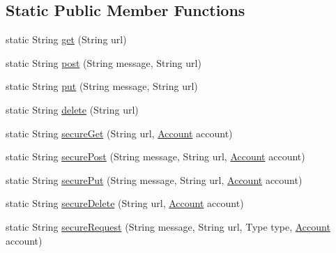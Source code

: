 \subsection*{Static Public Member Functions}
\begin{DoxyCompactItemize}
\item 
static String \hyperlink{classuk_1_1ac_1_1swan_1_1digitaltrails_1_1utils_1_1_h_t_t_p_ae693a8b73812be4b9923a973cb5fb50e}{get} (String url)
\item 
static String \hyperlink{classuk_1_1ac_1_1swan_1_1digitaltrails_1_1utils_1_1_h_t_t_p_a71175ca2eeb807eace9fb9b3ad904278}{post} (String message, String url)
\item 
static String \hyperlink{classuk_1_1ac_1_1swan_1_1digitaltrails_1_1utils_1_1_h_t_t_p_aaa96becb8f0232d1df98de034d52aeff}{put} (String message, String url)
\item 
static String \hyperlink{classuk_1_1ac_1_1swan_1_1digitaltrails_1_1utils_1_1_h_t_t_p_a6f6bf994fc898d4752b546e4100bc24a}{delete} (String url)
\item 
static String \hyperlink{classuk_1_1ac_1_1swan_1_1digitaltrails_1_1utils_1_1_h_t_t_p_af34648645c598fe67da4a775d9d3f047}{secure\+Get} (String url, \hyperlink{classuk_1_1ac_1_1swan_1_1digitaltrails_1_1components_1_1_account}{Account} account)
\item 
static String \hyperlink{classuk_1_1ac_1_1swan_1_1digitaltrails_1_1utils_1_1_h_t_t_p_a58d1d0b2d8abbba124b2265349051e9a}{secure\+Post} (String message, String url, \hyperlink{classuk_1_1ac_1_1swan_1_1digitaltrails_1_1components_1_1_account}{Account} account)
\item 
static String \hyperlink{classuk_1_1ac_1_1swan_1_1digitaltrails_1_1utils_1_1_h_t_t_p_aa5005a61c1b439529061b948ad4050ab}{secure\+Put} (String message, String url, \hyperlink{classuk_1_1ac_1_1swan_1_1digitaltrails_1_1components_1_1_account}{Account} account)
\item 
static String \hyperlink{classuk_1_1ac_1_1swan_1_1digitaltrails_1_1utils_1_1_h_t_t_p_aa9e748404d6dc70642b9dd6a7ef188a0}{secure\+Delete} (String url, \hyperlink{classuk_1_1ac_1_1swan_1_1digitaltrails_1_1components_1_1_account}{Account} account)
\item 
static String \hyperlink{classuk_1_1ac_1_1swan_1_1digitaltrails_1_1utils_1_1_h_t_t_p_aa0274af3adb019f5a332b2a1e6c561ef}{secure\+Request} (String message, String url, Type type, \hyperlink{classuk_1_1ac_1_1swan_1_1digitaltrails_1_1components_1_1_account}{Account} account)
\item 

\end{DoxyCompactItemize}
